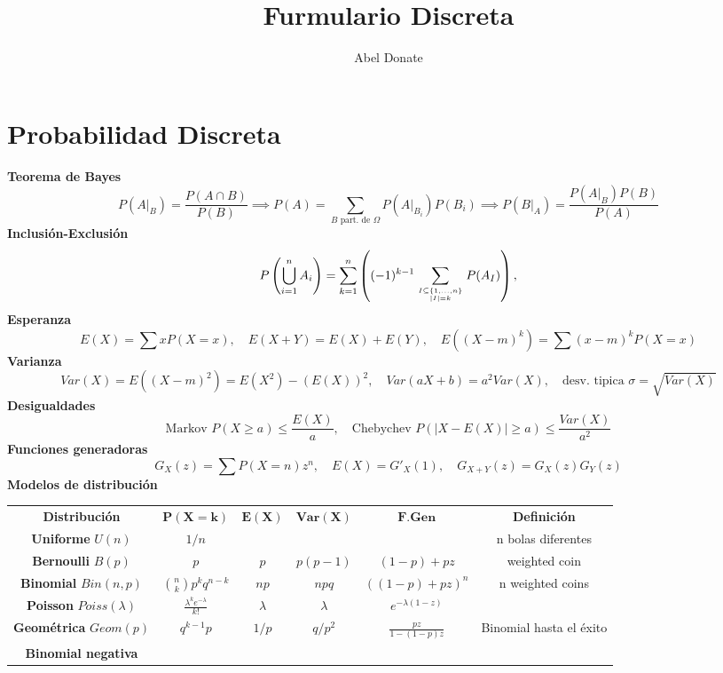 \documentclass{article}
\title{Furmulario Discreta}
\author{Abel Donate}
\newcommand{\X}{X}
\newcommand{\h}{\hspace{1em}}
\begin{document}
\noindent
\section{Probabilidad Discreta}
\textbf{Teorema de Bayes }\\
\[P(A|_B) = \frac{P(A\cap B)}{P(B)} \implies P(A) = \sum_{B \text{ part. de } \Omega} P(A|_{B_i})P(B_i) \implies P(B|_A) = \frac{P(A|_B)P(B)}{P(A)}\]
\noindent
\textbf{Inclusión-Exclusión}
\[{\displaystyle P \left(\bigcup _{i=1}^{n}A_{i}\right)=\sum _{k=1}^{n}\left((-1)^{k-1}\sum _{I\subseteq \{1,\ldots ,n\} \atop |I|=k}P (A_{I})\right),}\]
\textbf{Esperanza}
\[E(\X)=\sum xP(\X=x), \h E(\X + Y) = E(\X) + E(Y), \h E((X-m)^k)=\sum (x-m)^kP(X=x)\]
\textbf{Varianza}
\[Var(X)=E((X-m)^2)=E(X^2)-(E(X))^2, \h Var(aX+b)=a^2Var(X), \h \text{desv. tipica } \sigma = \sqrt{Var(X)}\]
\textbf{Desigualdades}
\[\text{Markov } P(X\geq a)\leq \frac{E(X)}{a}, \h \text{Chebychev } P(|X-E(X)|\geq a)\leq \frac{Var(X)}{a^2} \]
\textbf{Funciones generadoras}\\
\[G_X(z)=\sum P(X=n)z^n, \h E(X)=G'_X(1), \h G_{X+Y}(z)=G_X(z)G_Y(z)\]
\textbf{Modelos de distribución}
\begin{table}[h!]
    \centering
    \begin{tabular}{c|c|c|c|c|c}
        \textbf{Distribución} & $\mathbf{P(\X = k)}$ & $\mathbf{E(\X)}$ & $\mathbf{Var(X)}$ & $\mathbf{F. Gen}$ & \textbf{Definición}\\
        \textbf{Uniforme} $U(n)$ &  $1/n$ & & & & n bolas diferentes\\ 
        \textbf{Bernoulli} $B(p)$ & $p$ & $p$ & $p(p-1)$ & $(1-p)+pz$ & weighted coin\\
        \textbf{Binomial} $Bin(n,p)$ & $\binom{n}{k}p^kq^{n-k}$ & $np$ & $npq$ & $((1-p)+pz)^n$ & n weighted coins\\
        \textbf{Poisson} $Poiss(\lambda)$& $\frac{\lambda^ke^{-\lambda}}{k!}$ & $\lambda$ & $\lambda$ & $e^{-\lambda (1-z)}$\\
        \textbf{Geométrica} $Geom(p)$& $q^{k-1}p$ & $1/p$ & $q/p^2$ & $\frac{pz}{1-(1-p)z}$ & Binomial hasta el éxito\\
        \textbf{Binomial negativa}
    \end{tabular}
\end{table}
\end{document}
